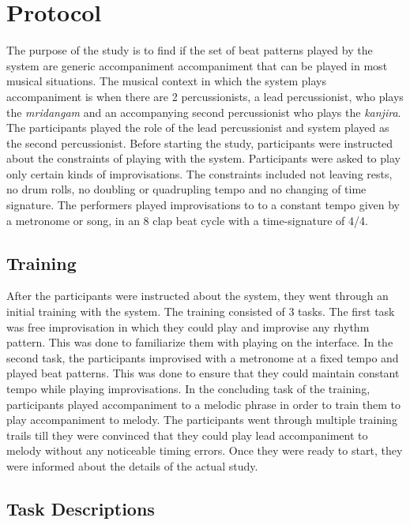 
\section{Protocol}

The purpose of the study is to find if the set of beat patterns played by the system are generic accompaniment accompaniment that can be played in most musical situations. The musical context in which the system plays accompaniment is when there are 2 percussionists, a lead percussionist, who plays the \emph{mridangam} and an accompanying second percussionist who plays the \emph{kanjira}. The participants played the role of the lead percussionist and system played as the second percussionist. Before starting the study, participants were instructed about the constraints of playing with the system. Participants were asked to play only certain kinds of improvisations. The constraints included not leaving rests, no drum rolls, no doubling or quadrupling tempo and no changing of time signature. The performers played improvisations to to a constant tempo given by a metronome or song, in an 8 clap beat cycle with a time-signature of 4/4. 

\subsection{Training}

After the participants were instructed about the system, they went through an initial training with the system. The training consisted of 3 tasks. The first task was free improvisation in which they could play and improvise any rhythm pattern. This was done to familiarize them with playing on the interface. In the second task, the participants improvised with a metronome at a fixed tempo and played beat patterns. This was done to ensure that they could maintain constant tempo while playing improvisations. In the concluding task of the training, participants played accompaniment to a melodic phrase in order to train them to play accompaniment to melody. The participants went through multiple training trails till they were convinced that they could play lead accompaniment to melody without any noticeable timing errors. Once they were ready to start, they were informed about the details of the actual study. 


\subsection{Task Descriptions}

